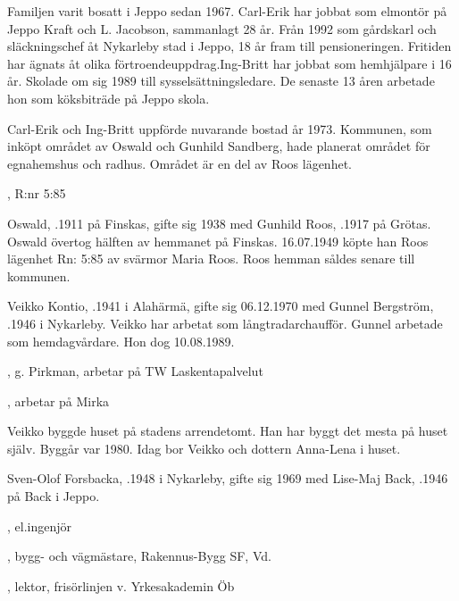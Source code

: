 Familjen varit bosatt i Jeppo sedan 1967. Carl-Erik har jobbat som elmontör på Jeppo Kraft och L. Jacobson, sammanlagt 28 år. Från 1992 som gårdskarl och släckningschef åt Nykarleby stad i Jeppo, 18 år fram till pensioneringen. Fritiden har ägnats åt olika förtroendeuppdrag.Ing-Britt har jobbat som hemhjälpare i 16 år. Skolade om sig 1989 till sysselsättningsledare. De senaste 13 åren arbetade hon som köksbiträde på Jeppo skola.

Carl-Erik och Ing-Britt uppförde nuvarande bostad år 1973. Kommunen, som inköpt området av Oswald och Gunhild Sandberg, hade planerat området för egnahemshus och radhus. Området är en del av Roos lägenhet.


,  R:nr 5:85

Oswald, .1911 på Finskas, gifte sig 1938 med Gunhild Roos, .1917 på Grötas. Oswald övertog hälften av hemmanet på Finskas. 16.07.1949 köpte han Roos lägenhet Rn: 5:85 av svärmor Maria Roos. Roos hemman såldes senare till kommunen.






Veikko Kontio, .1941 i Alahärmä, gifte sig 06.12.1970 med Gunnel Bergström, .1946 i Nykarleby. Veikko har arbetat som långtradarchaufför. Gunnel arbetade som hemdagvårdare. Hon dog 10.08.1989.
\begin{jhchildren}
  \item {},  g. Pirkman, arbetar på TW Laskentapalvelut
  \item {}, arbetar på Mirka
\end{jhchildren}

Veikko byggde huset på stadens arrendetomt. Han har byggt det mesta på huset själv. Byggår var 1980. Idag bor Veikko och dottern Anna-Lena i huset.






Sven-Olof Forsbacka, .1948 i Nykarleby, gifte sig 1969 med Lise-Maj Back, .1946 på Back i Jeppo.
\begin{jhchildren}
  \item {}, el.ingenjör
  \item {}, bygg- och vägmästare, Rakennus-Bygg SF, Vd.
  \item {}, lektor, frisörlinjen v. Yrkesakademin Öb
\end{jhchildren}

